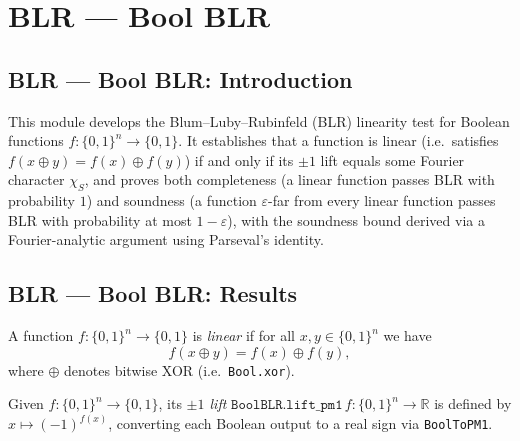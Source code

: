 \section{BLR --- Bool BLR}
\subsection*{BLR --- Bool BLR: Introduction}

This module develops the Blum--Luby--Rubinfeld (BLR) linearity test for
Boolean functions $f : \{0,1\}^n \to \{0,1\}$.  It establishes that a
function is linear (i.e.\ satisfies $f(x \oplus y) = f(x) \oplus f(y)$)
if and only if its $\pm 1$ lift equals some Fourier character $\chi_S$, and
proves both completeness (a linear function passes BLR with probability $1$)
and soundness (a function $\varepsilon$-far from every linear function passes
BLR with probability at most $1-\varepsilon$), with the soundness bound
derived via a Fourier-analytic argument using Parseval's identity.

\subsection*{BLR --- Bool BLR: Results}

\begin{definition}
\label{BoolBLR.is_linear_bool}
\leanok
{}
A function $f : \{0,1\}^n \to \{0,1\}$ is \emph{linear} if for all
$x, y \in \{0,1\}^n$ we have
\[
  f(x \oplus y) = f(x) \oplus f(y),
\]
where $\oplus$ denotes bitwise XOR (i.e.\ \texttt{Bool.xor}).
\end{definition}

\begin{definition}
\label{BoolBLR.lift_pm1}
\leanok
{}
Given $f : \{0,1\}^n \to \{0,1\}$, its \emph{$\pm 1$ lift}
$\texttt{BoolBLR.lift\_pm1}\,f : \{0,1\}^n \to \mathbb{R}$ is defined by
$x \mapsto (-1)^{f(x)}$, converting each Boolean output to a real sign via
\texttt{BoolToPM1}.
\end{definition}


